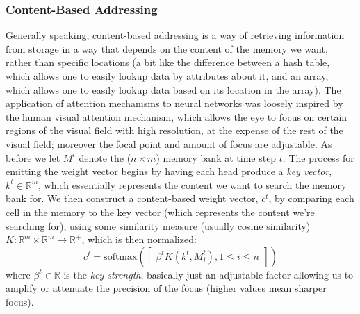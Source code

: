\documentclass{article}
\begin{document}
\subsubsection{Content-Based Addressing}
Generally speaking, content-based addressing is a way of retrieving information from storage in a way that depends on the content of the memory we want, rather than specific locations (a bit like the difference between a hash table, which allows one to easily lookup data by attributes about it, and an array, which allows one to easily lookup data based on its location in the array). The application of attention mechanisms to neural networks was loosely inspired by the human visual attention mechanism, which allows the eye to focus on certain regions of the visual field with high resolution, at the expense of the rest of the visual field; moreover the focal point and amount of focus are adjustable.
\newline \newline
As before we let $ M^t $ denote the ($ n \times m $) memory bank at time step $ t $. The process for emitting the weight vector begins by having each head produce a \textit{key vector}, $ k^t \in \mathbb{R}^m $, which essentially represents the content we want to search the memory bank for. We then construct a content-based weight vector, $ c^t $, by comparing each cell in the memory to the key vector (which represents the content we're searching for), using some similarity measure (usually cosine similarity) $ K: \mathbb{R}^m \times \mathbb{R}^m \rightarrow \mathbb{R}^+ $, which is then normalized:
$$ c^t = \text{softmax}\left( \begin{bmatrix} \beta^t K(k^t, M^t_i), 1 \leq i \leq n \end{bmatrix} \right) $$
where $ \beta^t \in \mathbb{R} $ is the \textit{key strength}, basically just an adjustable factor allowing us to amplify or attenuate the precision of the focus (higher values mean sharper focus).
\end{document}
